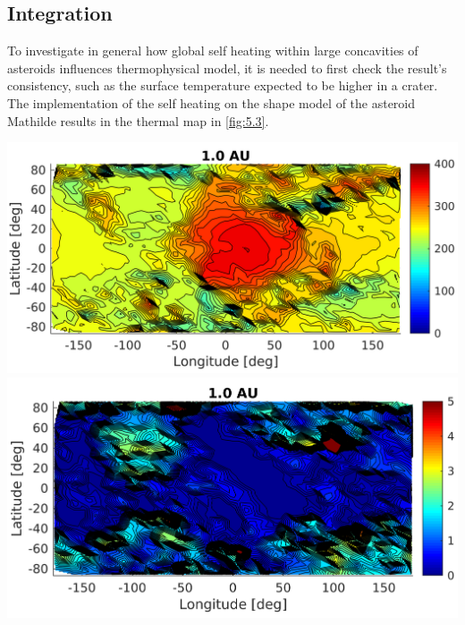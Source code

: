 \subsection{Integration}
To investigate in general how global self heating within large concavities of asteroids influences thermophysical model, it is needed to first check the result's consistency, such as the surface temperature expected to be higher in a crater. The implementation of the self heating on the shape model of the asteroid Mathilde results in the thermal map in \autoref{fig:5.3}.
\begin{center}
    \includegraphics[width=\linewidth]{rsc/self_2D.png}
    \includegraphics[width=\linewidth]{rsc/self_2D_diff.png}
    \label{fig:5.3}
\end{center}

